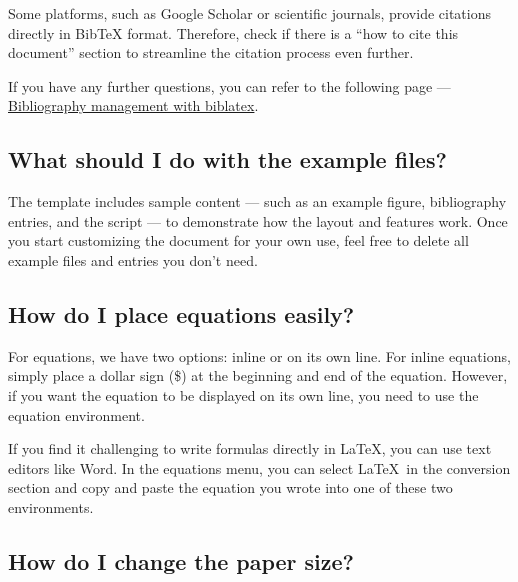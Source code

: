 \documentclass[9pt,a4paper,twocolumn,twoside]{rho-class/rho}
\begin{document}
        \begin{note}
            Some platforms, such as Google Scholar or scientific journals, provide citations directly in BibTeX format. Therefore, check if there is a ``how to cite this document'' section to streamline the citation process even further.
        \end{note}

        If you have any further questions, you can refer to the following page — \href{https://es.overleaf.com/learn/latex/Bibliography_management_with_biblatex}{Bibliography management with biblatex}.
        
    \subsection*{What should I do with the example files?}

        The template includes sample content — such as an example figure, bibliography entries, and the  script — to demonstrate how the layout and features work. Once you start customizing the document for your own use, feel free to delete all example files and entries you don’t need.

    \subsection*{How do I place equations easily?}

        For equations, we have two options: inline or on its own line. For inline equations, simply place a dollar sign (\$) at the beginning and end of the equation. However, if you want the equation to be displayed on its own line, you need to use the equation environment.
        
        If you find it challenging to write formulas directly in \LaTeX, you can use text editors like Word. In the equations menu, you can select \LaTeX\ in the conversion section and copy and paste the equation you wrote into one of these two environments.

    \subsection*{How do I change the paper size?}
\end{document}
